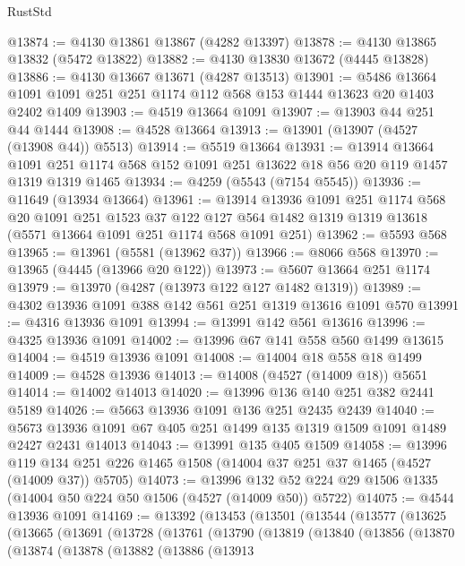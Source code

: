 \begin{lexlean}{RustStd}
\begin{coremodule}
@13874 := @4130 @13861 @13867 (@4282 @13397)
@13878 := @4130 @13865 @13832 (@5472 @13822)
@13882 := @4130 @13830 @13672 (@4445 @13828)
@13886 := @4130 @13667 @13671 (@4287 @13513)
@13901 := @5486 @13664 @1091 @1091 @251 @251 @1174 @112 @568 @153 @1444 @13623 @20 @1403 @2402 @1409
@13903 := @4519 @13664 @1091
@13907 := @13903 @44 @251 @44 @1444
@13908 := @4528 @13664
@13913 := @13901 (@13907 (@4527 (@13908 @44)) @5513)
@13914 := @5519 @13664
@13931 := @13914
    @13664
    @1091
    @251
    @1174
    @568
    @152
    @1091
    @251
    @13622
    @18
    @56
    @20
    @119
    @1457
    @1319
    @1319
    @1465
@13934 := @4259 (@5543 (@7154 @5545))
@13936 := @11649 (@13934 @13664)
@13961 := @13914
    @13936
    @1091
    @251
    @1174
    @568
    @20
    @1091
    @251
    @1523
    @37
    @122
    @127
    @564
    @1482
    @1319
    @1319
    @13618
    (@5571 @13664 @1091 @251 @1174 @568 @1091 @251)
@13962 := @5593 @568
@13965 := @13961 (@5581 (@13962 @37))
@13966 := @8066 @568
@13970 := @13965 (@4445 (@13966 @20 @122))
@13973 := @5607 @13664 @251 @1174
@13979 := @13970 (@4287 (@13973 @122 @127 @1482 @1319))
@13989 := @4302 @13936 @1091 @388 @142 @561 @251 @1319 @13616 @1091 @570
@13991 := @4316 @13936 @1091
@13994 := @13991 @142 @561 @13616
@13996 := @4325 @13936 @1091
@14002 := @13996 @67 @141 @558 @560 @1499 @13615
@14004 := @4519 @13936 @1091
@14008 := @14004 @18 @558 @18 @1499
@14009 := @4528 @13936
@14013 := @14008 (@4527 (@14009 @18)) @5651
@14014 := @14002 @14013
@14020 := @13996 @136 @140 @251 @382 @2441 @5189
@14026 := @5663 @13936 @1091 @136 @251 @2435 @2439
@14040 := @5673 @13936 @1091 @67 @405 @251 @1499 @135 @1319 @1509 @1091 @1489 @2427 @2431 @14013
@14043 := @13991 @135 @405 @1509
@14058 := @13996
    @119
    @134
    @251
    @226
    @1465
    @1508
    (@14004 @37 @251 @37 @1465 (@4527 (@14009 @37)) @5705)
@14073 := @13996
    @132
    @52
    @224
    @29
    @1506
    @1335
    (@14004 @50 @224 @50 @1506 (@4527 (@14009 @50)) @5722)
@14075 := @4544 @13936 @1091
@14169 := @13392
    (@13453
      (@13501
        (@13544
          (@13577
            (@13625
              (@13665
                (@13691
                  (@13728
                    (@13761
                      (@13790
                        (@13819
                          (@13840
                            (@13856
                              (@13870
                                (@13874
                                  (@13878
                                    (@13882
                                      (@13886
                                        (@13913

\end{coremodule}
\end{lexlean}
